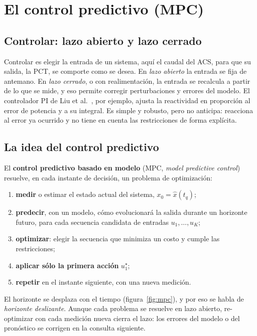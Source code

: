 \section{El control predictivo (MPC)}\label{sec:mpc}

\subsection{Controlar: lazo abierto y lazo cerrado}
Controlar es elegir la entrada de un sistema, aquí el caudal del ACS, para que su salida, la
PCT, se comporte como se desea. En \emph{lazo abierto} la entrada se fija de antemano. En
\emph{lazo cerrado}, o con realimentación, la entrada se recalcula a partir de lo que se mide,
y eso permite corregir perturbaciones y errores del modelo. El controlador PI de Liu et
al.~\cite{liu2021}, por ejemplo, ajusta la reactividad en proporción al error de potencia y a
su integral. Es simple y robusto, pero no anticipa: reacciona al error ya ocurrido y no tiene
en cuenta las restricciones de forma explícita.

\subsection{La idea del control predictivo}
El \textbf{control predictivo basado en modelo} (MPC, \emph{model predictive
control})~\cite{rawlings2017,camacho2007} resuelve, en cada instante de decisión, un problema
de optimización:
\begin{enumerate}
  \item \textbf{medir} o estimar el estado actual del sistema, $x_0=\hat x(t_q)$;
  \item \textbf{predecir}, con un modelo, cómo evolucionará la salida durante un horizonte
        futuro, para cada secuencia candidata de entradas $u_1,\dots,u_K$;
  \item \textbf{optimizar}: elegir la secuencia que minimiza un costo y cumple las
        restricciones;
  \item \textbf{aplicar sólo la primera acción} $u_1^\star$;
  \item \textbf{repetir} en el instante siguiente, con una nueva medición.
\end{enumerate}
El horizonte se desplaza con el tiempo (figura~\ref{fig:mpc}), y por eso se habla de
\emph{horizonte deslizante}. Aunque cada problema se resuelve en lazo abierto, re-optimizar con
cada medición nueva cierra el lazo: los errores del modelo o del pronóstico se corrigen en la
consulta siguiente.

